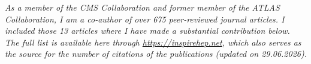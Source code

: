 

    {\tiny \textit{As a member of the CMS Collaboration and former member of the ATLAS Collaboration, I am a co-author of over 675 peer-reviewed journal articles. I included those 13 articles where I have made a substantial contribution below. The full list is available here through \href{https://inspirehep.net/}{https://inspirehep.net}, which also serves as the source for the number of citations of the publications (updated on 29.06.2026).}}


